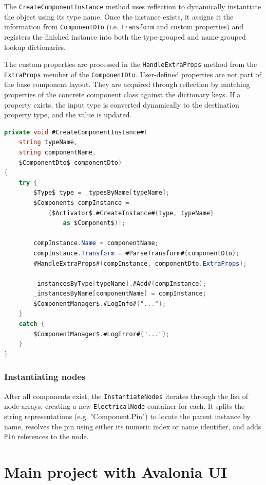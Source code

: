 The \texttt{CreateComponentInstance} method uses reflection to dynamically instantiate the object using its type name. Once the instance exists, it assigns it the information from \texttt{ComponentDto} (i.e. \texttt{Transform} and custom properties) and registers the finished instance into both the type-grouped and name-grouped lookup dictionaries.

The custom properties are processed in the \texttt{HandleExtraProps} method from the \texttt{ExtraProps} member of the \texttt{ComponentDto}. User-defined properties are not part of the base component layout. They are acquired through reflection by matching properties of the concrete component class against the dictionary keys. If a property exists, the input type is converted dynamically to the destination property type, and the value is updated.

\begin{lstlisting}[language=csharp, caption={\texttt{YamlSceneLoader.CreateComponentInstance} method}]
private void #CreateComponentInstance#(
    string typeName, 
    string componentName, 
    $ComponentDto$ componentDto) 
{
    try {
        $Type$ type = _typesByName[typeName];
        $Component$ compInstance = 
            ($Activator$.#CreateInstance#(type, typeName) 
                as $Component$)!;

        compInstance.Name = componentName;
        compInstance.Transform = #ParseTransform#(componentDto);
        #HandleExtraProps#(compInstance, componentDto.ExtraProps);

        _instancesByType[typeName].#Add#(compInstance);
        _instancesByName[componentName] = compInstance;
        $ComponentManager$.#LogInfo#("...");
    }
    catch {
        $ComponentManager$.#LogError#("...");
    }
}
\end{lstlisting}

\subsubsection{Instantiating nodes}

After all components exist, the \texttt{InstantiateNodes} iterates through the list of node arrays, creating a new \texttt{ElectricalNode} container for each. It splits the string representations (e.g. "Component.Pin") to locate the parent instance by name, resolves the pin using either its numeric index or name identifier, and adds \texttt{Pin} references to the node.

\section{Main project with Avalonia UI}

